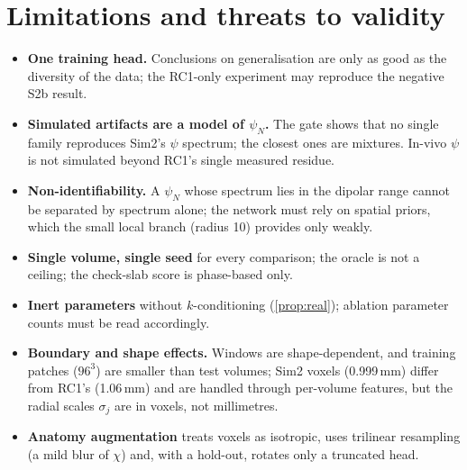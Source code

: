 \documentclass[11pt]{article}
\theoremstyle{remark}
\begin{document}
\section{Limitations and threats to validity}\label{sec:limits}
\begin{itemize}[leftmargin=1.5em,itemsep=2pt]
\item \textbf{One training head.} Conclusions on generalisation are only as good as the diversity of the data; the RC1-only experiment may reproduce the negative S2b result.
\item \textbf{Simulated artifacts are a model of $\psi_N$.} The gate shows that no single family reproduces Sim2's $\psi$ spectrum; the closest ones are mixtures. In-vivo $\psi$ is not simulated beyond RC1's single measured residue.
\item \textbf{Non-identifiability.} A $\psi_N$ whose spectrum lies in the dipolar range cannot be separated by spectrum alone; the network must rely on spatial priors, which the small local branch (radius 10) provides only weakly.
\item \textbf{Single volume, single seed} for every comparison; the oracle is not a ceiling; the check-slab score is phase-based only.
\item \textbf{Inert parameters} without $k$-conditioning (\cref{prop:real}); ablation parameter counts must be read accordingly.
\item \textbf{Boundary and shape effects.} Windows are shape-dependent, and training patches ($96^3$) are smaller than test volumes; Sim2 voxels (0.999\,mm) differ from RC1's (1.06\,mm) and are handled through per-volume features, but the radial scales $\sigma_j$ are in voxels, not millimetres.
\item \textbf{Anatomy augmentation} treats voxels as isotropic, uses trilinear resampling (a mild blur of $\chi$) and, with a hold-out, rotates only a truncated head.
\end{itemize}
\end{document}
